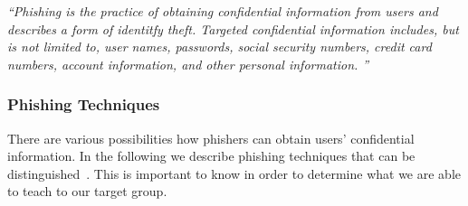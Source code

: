 \begin{center}
\textit{``Phishing is the practice of obtaining confidential information from users and describes a form of identitfy theft.
 Targeted confidential information includes, but is not limited to, user names, passwords, social security numbers, credit card numbers, account information, and other personal information.
''}~\cite{jakobsson2006phishing}
\end{center}

\subsubsection{Phishing Techniques}
\label{s:phishing_techs}
There are various possibilities how phishers can obtain users' confidential information.
 In the following we describe phishing techniques that can be distinguished~\cite{jakobsson2006phishing, phishingtechniques}.
 This is important to know in order to determine what we are able to teach to our target group.

